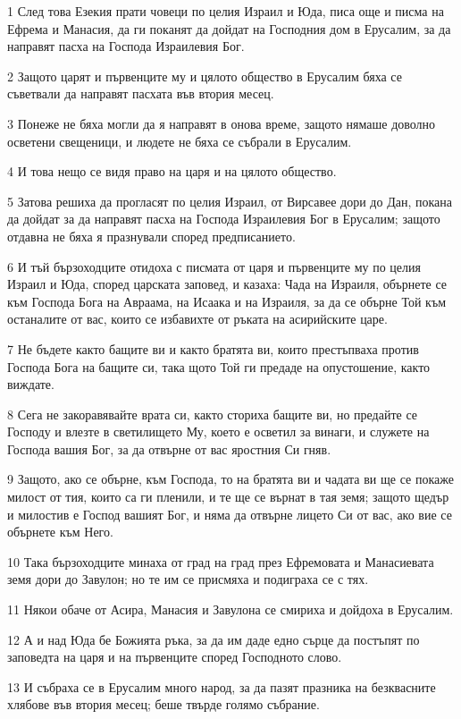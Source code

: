 \par 1 След това Езекия прати човеци по целия Израил и Юда, писа още и писма на Ефрема и Манасия, да ги поканят да дойдат на Господния дом в Ерусалим, за да направят пасха на Господа Израилевия Бог.
\par 2 Защото царят и първенците му и цялото общество в Ерусалим бяха се съветвали да направят пасхата във втория месец.
\par 3 Понеже не бяха могли да я направят в онова време, защото нямаше доволно осветени свещеници, и людете не бяха се събрали в Ерусалим.
\par 4 И това нещо се видя право на царя и на цялото общество.
\par 5 Затова решиха да прогласят по целия Израил, от Вирсавее дори до Дан, покана да дойдат за да направят пасха на Господа Израилевия Бог в Ерусалим; защото отдавна не бяха я празнували според предписанието.
\par 6 И тъй бързоходците отидоха с писмата от царя и първенците му по целия Израил и Юда, според царската заповед, и казаха: Чада на Израиля, обърнете се към Господа Бога на Авраама, на Исаака и на Израиля, за да се обърне Той към останалите от вас, които се избавихте от ръката на асирийските царе.
\par 7 Не бъдете както бащите ви и както братята ви, които престъпваха против Господа Бога на бащите си, така щото Той ги предаде на опустошение, както виждате.
\par 8 Сега не закоравявайте врата си, както сториха бащите ви, но предайте се Господу и влезте в светилището Му, което е осветил за винаги, и служете на Господа вашия Бог, за да отвърне от вас яростния Си гняв.
\par 9 Защото, ако се обърне, към Господа, то на братята ви и чадата ви ще се покаже милост от тия, които са ги пленили, и те ще се върнат в тая земя; защото щедър и милостив е Господ вашият Бог, и няма да отвърне лицето Си от вас, ако вие се обърнете към Него.
\par 10 Така бързоходците минаха от град на град през Ефремовата и Манасиевата земя дори до Завулон; но те им се присмяха и подиграха се с тях.
\par 11 Някои обаче от Асира, Манасия и Завулона се смириха и дойдоха в Ерусалим.
\par 12 А и над Юда бе Божията ръка, за да им даде едно сърце да постъпят по заповедта на царя и на първенците според Господното слово.
\par 13 И събраха се в Ерусалим много народ, за да пазят празника на безквасните хлябове във втория месец; беше твърде голямо събрание.
